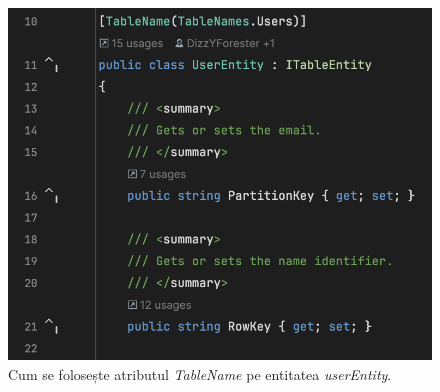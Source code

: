 \begin{figure}[H]
    \centering
    \includegraphics[width=12cm]{Assets/userEntity.png}
    \caption{Cum se folosește atributul \textit{TableName} pe entitatea \textit{userEntity}.}
    \label{fig:userEntity}
\end{figure}
